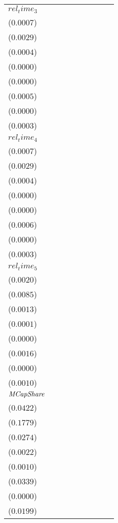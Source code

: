 \begin{tabular}{lllllllll}
$rel_time_3$ & \makecell{$0.0028^{***}$ \\ ($0.0007$)} & \makecell{$0.0125^{***}$ \\ ($0.0029$)} & \makecell{$-0.0044^{***}$ \\ ($0.0004$)} & \makecell{$-0.0004^{***}$ \\ ($0.0000$)} & \makecell{$-0.0002^{***}$ \\ ($0.0000$)} & \makecell{$0.0016^{***}$ \\ ($0.0005$)} & \makecell{$0.0000^{}$ \\ ($0.0000$)} & \makecell{$-0.0034^{***}$ \\ ($0.0003$)} \\
$rel_time_4$ & \makecell{$0.0034^{***}$ \\ ($0.0007$)} & \makecell{$0.0141^{***}$ \\ ($0.0029$)} & \makecell{$-0.0032^{***}$ \\ ($0.0004$)} & \makecell{$-0.0003^{***}$ \\ ($0.0000$)} & \makecell{$-0.0001^{***}$ \\ ($0.0000$)} & \makecell{$0.0023^{***}$ \\ ($0.0006$)} & \makecell{$0.0000^{***}$ \\ ($0.0000$)} & \makecell{$-0.0028^{***}$ \\ ($0.0003$)} \\
$rel_time_5$ & \makecell{$0.0029^{}$ \\ ($0.0020$)} & \makecell{$0.0127^{}$ \\ ($0.0085$)} & \makecell{$-0.0029^{**}$ \\ ($0.0013$)} & \makecell{$-0.0003^{***}$ \\ ($0.0001$)} & \makecell{$-0.0001^{**}$ \\ ($0.0000$)} & \makecell{$0.0017^{}$ \\ ($0.0016$)} & \makecell{$0.0000^{***}$ \\ ($0.0000$)} & \makecell{$-0.0024^{**}$ \\ ($0.0010$)} \\
${\it MCapShare}$ & \makecell{$0.6763^{***}$ \\ ($0.0422$)} & \makecell{$2.7993^{***}$ \\ ($0.1779$)} & \makecell{$0.0733^{***}$ \\ ($0.0274$)} & \makecell{$0.0064^{***}$ \\ ($0.0022$)} & \makecell{$0.0035^{***}$ \\ ($0.0010$)} & \makecell{$0.5364^{***}$ \\ ($0.0339$)} & \makecell{$-0.0000^{}$ \\ ($0.0000$)} & \makecell{$0.1492^{***}$ \\ ($0.0199$)} \\

\end{tabular}
